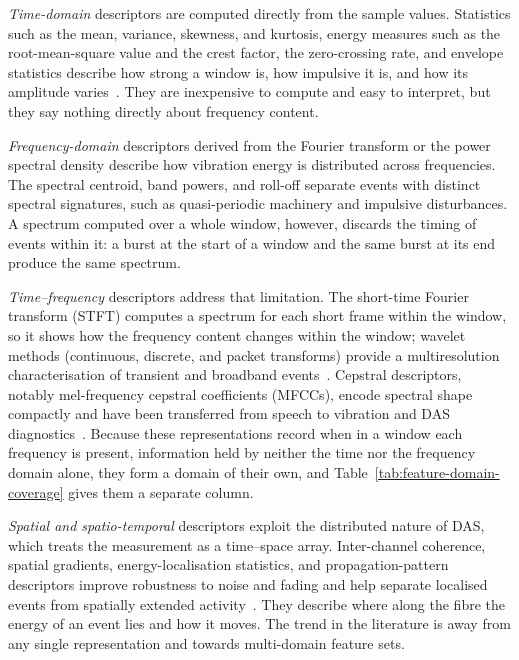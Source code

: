 \emph{Time-domain} descriptors are computed directly from the sample values. Statistics such as the mean, variance, skewness, and kurtosis, energy measures such as the root-mean-square value and the crest factor, the zero-crossing rate, and envelope statistics describe how strong a window is, how impulsive it is, and how its amplitude varies~\cite{sharma2020audio,shen2024abnormal}. They are inexpensive to compute and easy to interpret, but they say nothing directly about frequency content.

\emph{Frequency-domain} descriptors derived from the Fourier transform or the power spectral density describe how vibration energy is distributed across frequencies. The spectral centroid, band powers, and roll-off separate events with distinct spectral signatures, such as quasi-periodic machinery and impulsive disturbances. A spectrum computed over a whole window, however, discards the timing of events within it: a burst at the start of a window and the same burst at its end produce the same spectrum.

\emph{Time--frequency} descriptors address that limitation. The short-time Fourier transform (STFT) computes a spectrum for each short frame within the window, so it shows how the frequency content changes within the window; wavelet methods (continuous, discrete, and packet transforms) provide a multiresolution characterisation of transient and broadband events~\cite{kandamali2022ml,kozmin2025wavelet}. Cepstral descriptors, notably mel-frequency cepstral coefficients (MFCCs), encode spectral shape compactly and have been transferred from speech to vibration and DAS diagnostics~\cite{han2024intrusion}. Because these representations record when in a window each frequency is present, information held by neither the time nor the frequency domain alone, they form a domain of their own, and Table~\ref{tab:feature-domain-coverage} gives them a separate column.

\emph{Spatial and spatio-temporal} descriptors exploit the distributed nature of DAS, which treats the measurement as a time--space array. Inter-channel coherence, spatial gradients, energy-localisation statistics, and propagation-pattern descriptors improve robustness to noise and fading and help separate localised events from spatially extended activity~\cite{shen2024abnormal,kozmin2025wavelet}. They describe where along the fibre the energy of an event lies and how it moves. The trend in the literature is away from any single representation and towards multi-domain feature sets.

